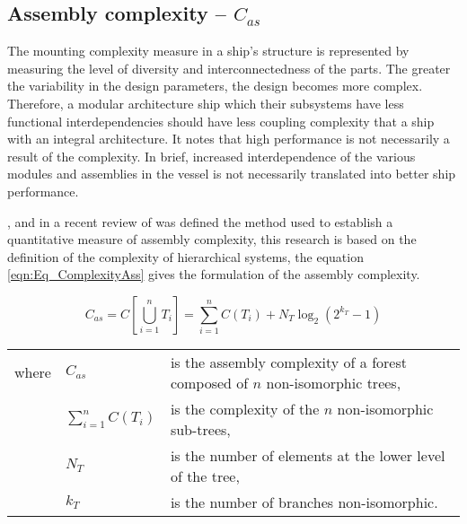 \subsection{Assembly complexity -- $C_{as}$}
The mounting complexity measure in a ship's structure is represented by measuring the level of diversity and interconnectedness of the parts. The greater the variability in the design parameters, the design becomes more complex. Therefore, a modular architecture ship which their subsystems have less functional interdependencies should have less coupling complexity that a ship with an integral architecture. It notes that high performance is not necessarily a result of the complexity. In brief,  increased interdependence of the various modules and assemblies in the vessel is not necessarily translated into better ship performance.


\cite{ceccatto1988complexity},  and in a recent review of \cite{Shannon01} was defined the method used to establish a quantitative measure of assembly complexity, this research is based on the definition of the complexity of hierarchical systems, the equation \ref{eqn:Eq_ComplexityAss} gives the formulation of the assembly complexity.


\begin{equation}
C_{as} = C\left[ \bigcup_{i=1}^n T_i \right] = \sum_{i=1}^{n} C(T_{i}) + N_T \log _2(2^{k_T}-1)
\label{eqn:Eq_ComplexityAss}
\end{equation}


\begin{tabular}{lll}
where & $C_{as}$ & is the assembly complexity of a forest composed of $n$ non-isomorphic trees,\\
& $\sum_{i=1}^{n} C(T_{i})$ & is the complexity of the $n$ non-isomorphic sub-trees,\\
& $N_T$ & is the number of elements at the lower level of the tree,\\
& $k_T$ & is the number of branches non-isomorphic.
\end{tabular}


